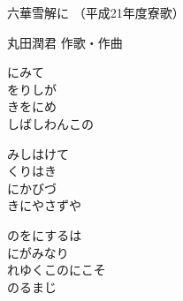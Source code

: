 \documentclass[10pt,b5j]{tarticle} %
\begin{document}
\begin{minipage}[c]{0.7\hsize} %
    \begin{center}
        {\LARGE
            六華雪解に %
        }
        {\small 
            （平成21年度寮歌） %
        }
    \end{center}
\end{minipage}
\begin{minipage}[c]{0.3\hsize} %
    \begin{flushright} %
        丸田潤君 作歌・作曲 %
    \end{flushright}
\end{minipage}

\vspace{1.5em} %
\newcommand{\linespace}{0.5em} %
\newcommand{\blocksize}{0.5\hsize} %
\begin{enumerate} %
    \begin{minipage}[c]{\blocksize}
    
        \vspace{\linespace}
        \item
        にみて\\
        をりしが\\
        きをにめ\\
        しばしわんこの
        
        \vspace{\linespace}
        \item
        みしはけて\\
        くりはき\\
        にかびづ\\
        きにやさずや
        
        \vspace{\linespace}
        \item
        のをにするは\\
        にがみなり\\
        れゆくこのにこそ\\
        のるまじ
    
    \end{minipage}
\end{enumerate} %
\end{document}
